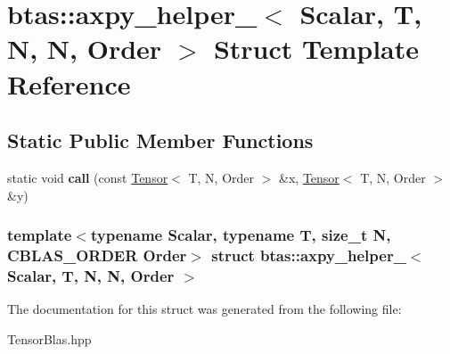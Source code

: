 \hypertarget{structbtas_1_1axpy__helper___3_01_scalar_00_01_t_00_01_n_00_01_n_00_01_order_01_4}{
\section{btas::axpy\_\-helper\_\-$<$ Scalar, T, N, N, Order $>$ Struct Template Reference}
\label{structbtas_1_1axpy__helper___3_01_scalar_00_01_t_00_01_n_00_01_n_00_01_order_01_4}
}
\subsection*{Static Public Member Functions}
\begin{DoxyCompactItemize}
\item 
\hypertarget{structbtas_1_1axpy__helper___3_01_scalar_00_01_t_00_01_n_00_01_n_00_01_order_01_4_a8f92031df30a3b71d16ecc6a4a0f1db6}{
static void {\bfseries call} (const \hyperlink{classbtas_1_1_tensor}{Tensor}$<$ T, N, Order $>$ \&x, \hyperlink{classbtas_1_1_tensor}{Tensor}$<$ T, N, Order $>$ \&y)}
\label{structbtas_1_1axpy__helper___3_01_scalar_00_01_t_00_01_n_00_01_n_00_01_order_01_4_a8f92031df30a3b71d16ecc6a4a0f1db6}

\end{DoxyCompactItemize}
\subsubsection*{template$<$typename Scalar, typename T, size\_\-t N, CBLAS\_\-ORDER Order$>$ struct btas::axpy\_\-helper\_\-$<$ Scalar, T, N, N, Order $>$}



The documentation for this struct was generated from the following file:\begin{DoxyCompactItemize}
\item 
TensorBlas.hpp\end{DoxyCompactItemize}
